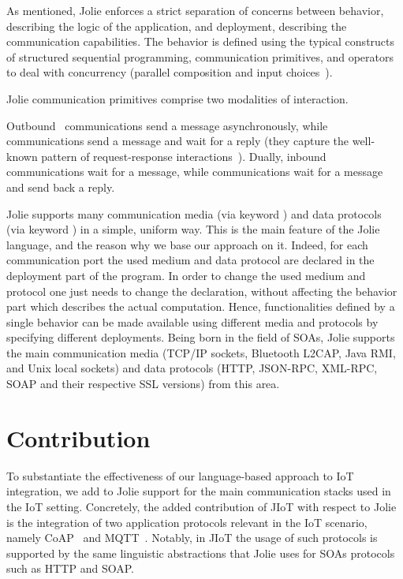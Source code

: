As mentioned, Jolie enforces a strict separation of concerns between behavior,
describing the logic of the application, and deployment, describing the
communication capabilities. The behavior is defined using the typical
constructs of structured sequential programming, communication primitives, and
operators to deal with concurrency (parallel composition and input
choices~\cite{MontesiGZ14}).

Jolie communication primitives comprise two modalities of interaction.

Outbound~ communications send a message asynchronously, while
 communications send a message and wait for a reply (they
capture the well-known pattern of request-response
interactions~\cite{req-rep}). Dually, inbound  communications wait
for a message, while  communications wait for a message
and send back a reply.
 
%
Jolie supports many communication media (via keyword
) and data protocols (via keyword ) in a simple,
uniform way. This is the main feature of the Jolie language, and the reason why
we base our approach on it.
%
Indeed, for each communication port the used medium and data protocol are
declared in the deployment part of the program.  In order to change the
used medium and protocol one just needs to change the declaration, without
affecting the behavior part which describes the actual computation.
Hence, functionalities defined by a single behavior can be made available using
different media and protocols by specifying different deployments. Being born
in the field of SOAs, Jolie supports the main communication media (TCP/IP
sockets, Bluetooth L2CAP, Java RMI, and Unix local sockets) and data protocols
(HTTP, JSON-RPC, XML-RPC, SOAP and their respective SSL versions) from this
area.

\section{Contribution}
\label{sec:contribution}
To substantiate the effectiveness of our language-based approach to IoT
integration, we add to Jolie support for the main communication stacks used in the
IoT setting. Concretely, the added contribution of JIoT with respect to Jolie
is the integration of two application protocols relevant in the IoT scenario,
namely CoAP~\cite{doi:10.17487/RFC7252,coap} and MQTT~\cite{mqtt-v3.1.1,mqtt}.
Notably, in JIoT the usage of such protocols is supported by the same
linguistic abstractions that Jolie uses for SOAs protocols such as HTTP and
SOAP.

